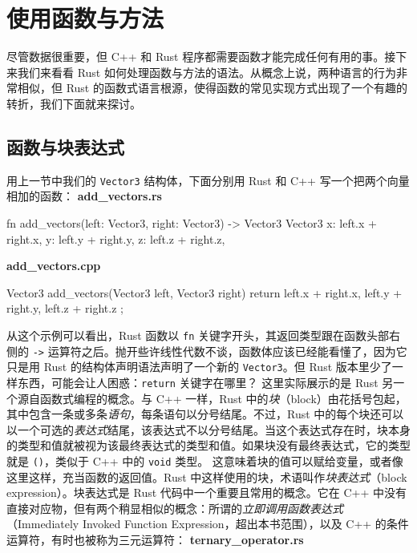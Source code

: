 \section{使用函数与方法}
\label{idx:idx_60920161}
\label{idx:idx_d56be3b9}
尽管数据很重要，但 C++ 和 Rust 程序都需要函数才能完成任何有用的事。接下来我们来看看 Rust 如何处理函数与方法的语法。从概念上说，两种语言的行为非常相似，但 Rust 的函数式语言根源，使得函数的常见实现方式出现了一个有趣的转折，我们下面就来探讨。
\subsection{函数与块表达式}
\label{idx:idx_ac1c3954}
\label{idx:idx_d8622c6a}
用上一节中我们的 \texttt{Vector3} 结构体，下面分别用 Rust 和 C++ 写一个把两个向量相加的函数：
\textbf{add\_\allowbreak{}vectors.\allowbreak{}rs}
\begin{codebox}[rust]
fn add_vectors(left: Vector3, right: Vector3) -> Vector3 {
    Vector3 {
        x: left.x + right.x,
        y: left.y + right.y,
        z: left.z + right.z,
    }
}
\end{codebox}
\textbf{add\_\allowbreak{}vectors.\allowbreak{}cpp}
\begin{codebox}[text]
Vector3 add_vectors(Vector3 left, Vector3 right) {
    return {
        left.x + right.x,
        left.y + right.y,
        left.z + right.z
    };
}
\end{codebox}
\label{idx:idx_dc4e5022}
从这个示例可以看出，Rust 函数以 \texttt{fn} 关键字开头，其返回类型跟在函数头部右侧的 \texttt{->} 运算符之后。抛开些许线性代数不谈，函数体应该已经能看懂了，因为它只是用 Rust 的结构体声明语法声明了一个新的 \texttt{Vector3}。但 Rust 版本里少了一样东西，可能会让人困惑：\texttt{return} 关键字在哪里？
\label{idx:idx_b1bfa0a0}
这里实际展示的是 Rust 另一个源自函数式编程的概念。与 C++ 一样，Rust 中的\emph{块}（block）由花括号包起，其中包含一条或多条\emph{语句}，每条语句以分号结尾。不过，Rust 中的每个块还可以以一个可选的\emph{表达式}结尾，该表达式不以分号结尾。当这个表达式存在时，块本身的类型和值就被视为该最终表达式的类型和值。如果块没有最终表达式，它的类型就是 \texttt{()}，类似于 C++ 中的 \texttt{void} 类型。
这意味着块的值可以赋给变量，或者像这里这样，充当函数的返回值。Rust 中这样使用的块，术语叫作\emph{块表达式}（block expression）。块表达式是 Rust 代码中一个重要且常用的概念。它在 C++ 中没有直接对应物，但有两个稍显相似的概念：所谓的\emph{立即调用函数表达式}（Immediately Invoked Function Expression，超出本书范围），以及 C++ 的条件运算符，有时也被称为三元运算符：
\textbf{ternary\_\allowbreak{}operator.\allowbreak{}rs}
